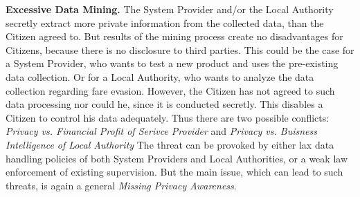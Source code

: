 %
%
%
\textbf{Excessive Data Mining.}
The System Provider and/or the Local Authority secretly extract more private information from the collected data, than the Citizen agreed to.
But results of the mining process create no disadvantages for Citizens, because there is no disclosure to third parties.
This could be the case for a System Provider, who wants to test a new product and uses the pre-existing data collection.
Or for a Local Authority, who wants to analyze the data collection regarding fare evasion.
However, the Citizen has not agreed to such data processing nor could he, since it is conducted secretly.
This disables a Citizen to control his data adequately.
Thus there are two possible conflicts: \textit{Privacy vs. Financial Profit of Serivce Provider} and  \textit{Privacy vs. Buisness Intelligence of Local Authority}
The threat can be provoked by either lax data handling policies of both System Providers and Local Authorities, or a weak law enforcement of existing supervision.
But the main issue, which can lead to such threats, is again a general \textit{Missing Privacy Awareness}.


